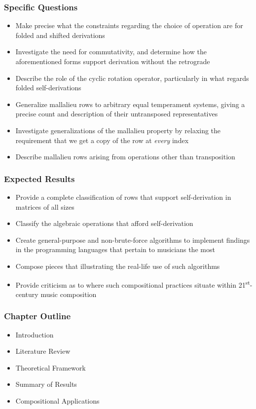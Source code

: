 \begin{frame}
	\frametitle{Specific Questions}
	\begin{itemize}
		\item Make precise what the constraints regarding the choice of operation are for folded and shifted derivations
		\item Investigate the need for commutativity, and determine how the aforementioned forms support derivation without the retrograde
		\item Describe the role of the cyclic rotation operator, particularly in what regards folded self-derivations
		\item Generalize mallalieu rows to arbitrary equal temperament systems, giving a precise count and description of their untransposed representatives
		\item Investigate generalizations of the mallalieu property by relaxing the requirement that we get a copy of the row at \emph{every} index
		\item Describe mallalieu rows arising from operations other than transposition
	\end{itemize}
\end{frame}

\begin{frame}
	\frametitle{Expected Results}
	\begin{itemize}
		\item Provide a complete classification of rows that support self-derivation in matrices of all sizes
		\item Classify the algebraic operations that afford self-derivation
		\item Create general-purpose and non-brute-force algorithms to implement findings in the programming languages that pertain to musicians the most
		\item Compose pieces that illustrating the real-life use of such algorithms
		\item Provide criticism as to where such compositional practices situate within 21\textsuperscript{st}-century music composition
	\end{itemize}
\end{frame}

\begin{frame}
	\frametitle{Chapter Outline}
	\begin{itemize}
		\item Introduction
		\item Literature Review
		\item Theoretical Framework
		\item Summary of Results
		\item Compositional Applications
	\end{itemize}
\end{frame}
